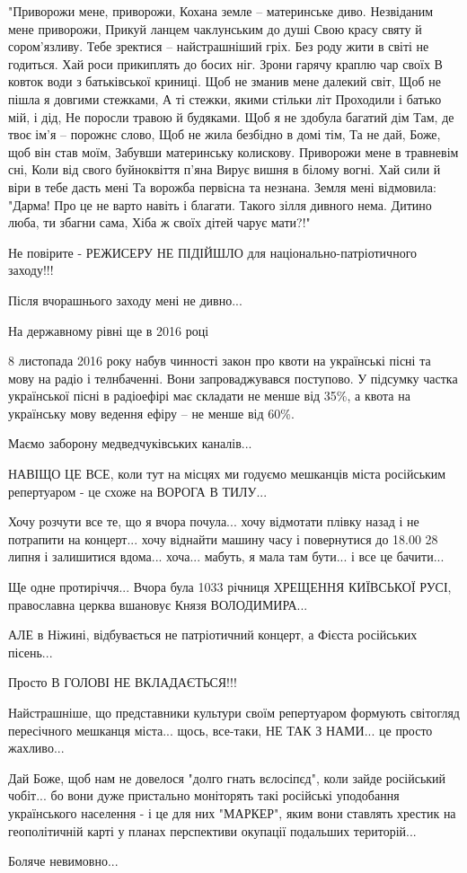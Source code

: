 \begin{multicols}{2}
\obeycr
"Приворожи мене, приворожи,
Кохана земле – материнське диво.
Незвіданим мене приворожи,
Прикуй ланцем чаклунським до душі
Свою красу святу й сором’язливу.
\smallskip
Тебе зректися – найстрашніший гріх.
Без роду жити в світі не годиться.
Хай роси прикиплять до босих ніг.
Зрони гарячу краплю чар своїх
В ковток води з батьківської криниці. 
\smallskip
Щоб не зманив мене далекий світ,
Щоб не пішла я довгими стежками,
А ті стежки, якими стільки літ
Проходили і батько мій, і дід,
Не поросли травою й будяками.
\smallskip
Щоб я не здобула багатий дім
Там, де твоє ім’я – порожнє слово,
Щоб не жила безбідно в домі тім,
Та не дай, Боже, щоб він став моїм,
Забувши материнську колискову.
\smallskip
Приворожи мене в травневім сні,
Коли від свого буйноквіття п’яна
Вирує вишня в білому вогні.
Хай сили й віри в тебе дасть мені
Та ворожба первісна та незнана.
\smallskip
Земля мені відмовила: "Дарма!
Про це не варто навіть і благати.
Такого зілля дивного нема.
Дитино люба, ти збагни сама,
Хіба ж своїх дітей чарує мати?!"
\restorecr
\end{multicols}

Не повірите - РЕЖИСЕРУ НЕ ПІДІЙШЛО для національно-патріотичного заходу!!!

Після вчорашнього заходу мені не дивно...

На державному рівні ще в 2016 році

8 листопада 2016 року набув чинності закон про квоти на українські пісні та
мову на радіо і телнбаченні. Вони запроваджувався поступово. У підсумку частка
української пісні в радіоефірі має складати не менше від 35\%, а квота на
українську мову ведення ефіру – не менше від 60\%.

Маємо заборону медведчуківських каналів...

НАВІЩО ЦЕ ВСЕ, коли тут на місцях ми годуємо мешканців міста російським
репертуаром - це схоже на ВОРОГА В ТИЛУ... 

Хочу розчути все те, що я вчора почула... хочу відмотати плівку назад і не
потрапити на концерт... хочу віднайти машину часу і повернутися до 18.00 28
липня і залишитися вдома... хоча... мабуть, я мала там бути... і все це
бачити...

Ще одне протиріччя... Вчора була 1033 річниця ХРЕЩЕННЯ КИЇВСЬКОЇ РУСІ,
православна церква вшановує Князя ВОЛОДИМИРА... 

АЛЕ в Ніжині, відбувається не патріотичний концерт, а Фієста російських пісень...

Просто В ГОЛОВІ НЕ ВКЛАДАЄТЬСЯ!!!

Найстрашніше, що представники культури своїм репертуаром формують світогляд
пересічного мешканця міста... щось, все-таки, НЕ ТАК З НАМИ... це просто
жахливо...

Дай Боже, щоб нам не довелося "долго гнать вєлосіпєд", коли зайде російський
чобіт... бо вони дуже пристально моніторять такі російські уподобання
українського населення - і це для них "МАРКЕР", яким вони ставлять хрестик на
геополітичній карті у планах перспективи окупації подальших територій...

Боляче невимовно...

